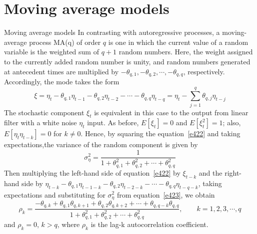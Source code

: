 \documentclass[8pt]{beamer}
\renewcommand{\emph}[1]{\textcolor{myorange}{#1}}
\begin{document}
\section{Moving average models}
\begin{frame}{Moving average models}
    In contrasting with \emph{autoregressive processes}, a \alert{moving-average process MA(q)} of order $q$ is one in which the current value of a random variable is the weighted sum of $q+1$ \emph{random numbers}. Here, the weight assigned to the currently added \emph{random number} is unity, and \emph{random numbers} generated at antecedent times are multiplied by $-\theta_{q,1}, -\theta_{q,2}, \cdots, -\theta_{q,q}$, respectively. Accordingly, the mode takes the form
    \begin{equation}
        \xi = \eta_t - \theta_{q,1} \eta_{t-1} - \theta_{q,2} \eta_{t-2}-\cdots- \theta_{q,q} \eta_{t-q} = \eta_t - \sum_{j=1}^q \theta_{q,j} \eta_{t-j}  
        \label{e422}
    \end{equation}
    The stochastic component $\xi_t$ is equivalent in this case to the output from \emph{linear filter} with a \emph{white noise } $\eta_t$ input. As before, $E[\xi_t] = 0$ and $E[\xi_t^2] =1$; also, $E[\eta_t \eta_{t-k}]=0$ for $k\neq 0$. Hence, by squaring the equation~\ref{e422} and taking expectations,the variance of the random component is given by
    \begin{equation}
        \sigma_{\eta}^2 = \frac{1}{1+\theta_{q,1}^2 + \theta_{q,2}^2 + \cdots + \theta_{q,q}^2}
        \label{e423}
    \end{equation}
    Then multiplying the left-hand side of equation~\ref{e422} by $\xi_{t-k}$ and the right-hand side by $\eta_{t-k} -\theta_{q,1}\eta_{t-1-k} - \theta_{q,2}\eta_{t-2-k} - \cdots -\theta_{q,q}\eta_{t-q-k}$, taking expectations and substituting for $\sigma_{\eta}^2$ from equation~\ref{e423}, we obtain
    \begin{equation}
        \rho_k = \frac{-\theta_{q,k} + \theta_{q,1}\theta_{q,k+1} + \theta_{q,2}\theta_{q,k+2}+ \cdots + \theta_{q, q-k}\theta_{q,q}}{1+\theta_{q,1}^2 + \theta_{q,2}^2 + \cdots + \theta_{q,q}^2 }, \quad \quad k =1,2,3,\cdots, q
        \label{e424}
        \end{equation}
        and $\rho_k = 0$, $k > q$, where $\rho_k$ is the lag-k \emph{autocorrelation coefficient}.
\end{frame}
\end{document}
